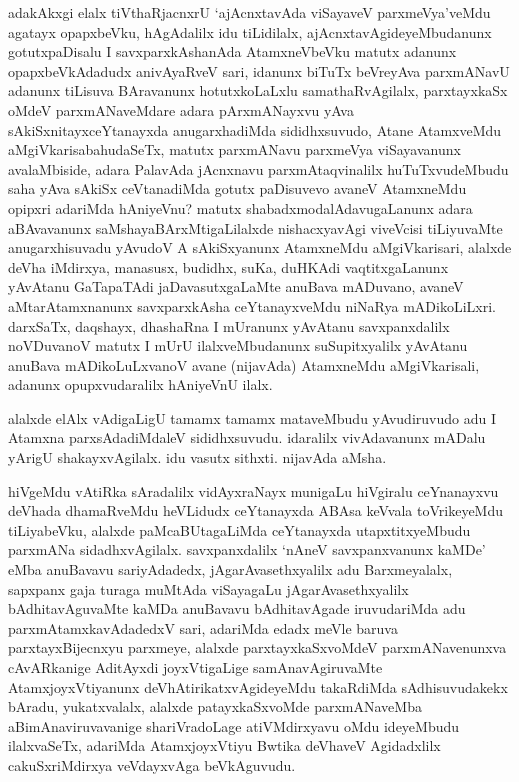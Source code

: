 \begin{artha}%
adakAkxgi elalx tiVthaRjacnxrU `ajAcnxtavAda viSayaveV parxmeVya'veMdu agatayx opapxbeVku, hAgAdalilx idu tiLidilalx, ajAcnxtavAgideyeMbudanunx gotutxpaDisalu I savxparxkAshanAda AtamxneVbeVku matutx adanunx opapxbeVkAdadudx anivAyaRveV sari, idanunx biTuTx beVreyAva parxmANavU adanunx tiLisuva BAravanunx hotutxkoLaLxlu samathaRvAgilalx, parxtayxkaSx oMdeV parxmANaveMdare adara pArxmANayxvu yAva sAkiSxnitayxceYtanayxda anugarxhadiMda sididhxsuvudo, Atane AtamxveMdu aMgiVkarisabahudaSeTx, matutx parxmANavu parxmeVya viSayavanunx avalaMbiside, adara PalavAda jAcnxnavu parxmAtaqvinalilx huTuTxvudeMbudu saha yAva sAkiSx ceVtanadiMda gotutx paDisuvevo avaneV AtamxneMdu opipxri adariMda hAniyeVnu? matutx shabadxmodalAdavugaLanunx adara aBAvavanunx saMshayaBArxMtigaLilalxde nishacxyavAgi viveVcisi tiLiyuvaMte anugarxhisuvadu yAvudoV A sAkiSxyanunx AtamxneMdu aMgiVkarisari, alalxde deVha iMdirxya, manasusx, budidhx, suKa, duHKAdi vaqtitxgaLanunx yAvAtanu GaTapaTAdi jaDavasutxgaLaMte anuBava mADuvano, avaneV aMtarAtamxnanunx savxparxkAsha ceYtanayxveMdu niNaRya mADikoLiLxri. darxSaTx, daqshayx, dhashaRna I mUranunx yAvAtanu savxpanxdalilx noVDuvanoV matutx I mUrU ilalxveMbudanunx suSupitxyalilx yAvAtanu anuBava mADikoLuLxvanoV avane (nijavAda) AtamxneMdu aMgiVkarisali, adanunx opupxvudaralilx hAniyeVnU ilalx.
\end{artha}

\begin{artha}
alalxde elAlx vAdigaLigU tamamx tamamx mataveMbudu yAvudiruvudo adu I Atamxna parxsAdadiMdaleV sididhxsuvudu. idaralilx vivAdavanunx mADalu yArigU shakayxvAgilalx. idu vasutx sithxti. nijavAda aMsha. 
\end{artha}

\begin{artha}
hiVgeMdu vAtiRka sAradalilx vidAyxraNayx munigaLu hiVgiralu ceYnanayxvu deVhada dhamaRveMdu heVLidudx ceYtanayxda ABAsa keVvala toVrikeyeMdu tiLiyabeVku, alalxde paMcaBUtagaLiMda ceYtanayxda utapxtitxyeMbudu parxmANa sidadhxvAgilalx. savxpanxdalilx `nAneV savxpanxvanunx kaMDe' eMba anuBavavu sariyAdadedx, jAgarAvasethxyalilx adu Barxmeyalalx, sapxpanx gaja turaga muMtAda viSayagaLu jAgarAvasethxyalilx bAdhitavAguvaMte kaMDa anuBavavu bAdhitavAgade iruvudariMda adu parxmAtamxkavAdadedxV sari, adariMda edadx meVle baruva parxtayxBijecnxyu parxmeye, alalxde parxtayxkaSxvoMdeV parxmANavenunxva cAvARkanige AditAyxdi joyxVtigaLige samAnavAgiruvaMte AtamxjoyxVtiyanunx deVhAtirikatxvAgideyeMdu takaRdiMda sAdhisuvudakekx bAradu, yukatxvalalx, alalxde patayxkaSxvoMde parxmANaveMba aBimAnaviruvavanige shariVradoLage atiVMdirxyavu oMdu ideyeMbudu ilalxvaSeTx, adariMda AtamxjoyxVtiyu Bwtika deVhaveV Agidadxlilx cakuSxriMdirxya veVdayxvAga beVkAguvudu.
\end{artha}%

